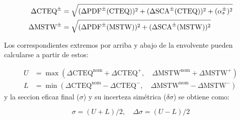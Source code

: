 \begin{align}
  \Delta\mathrm{CTEQ}^{\pm} &= \sqrt{(\Delta\mathrm{PDF}^{\pm}(\mathrm{CTEQ}))^2 + (\Delta\mathrm{SCA}^{\pm}(\mathrm{CTEQ}))^2 + (\alpha_s^{\pm})^2} \\
  \Delta\mathrm{MSTW}^{\pm} &= \sqrt{(\Delta\mathrm{PDF}^{\pm}(\mathrm{MSTW}))^2 + (\Delta\mathrm{SCA}^{\pm}(\mathrm{MSTW}))^2}
\end{align}

Los correspondientes extremos por arriba y abajo de la envolvente pueden calcularse a partir de estos:

\begin{align}
  U &= \max(\Delta\mathrm{CTEQ}^\mathrm{nom} + \Delta\mathrm{CTEQ}^{+},\quad \Delta\mathrm{MSTW}^\mathrm{nom} + \Delta\mathrm{MSTW}^{+}) \\
  L &= \min(\Delta\mathrm{CTEQ}^\mathrm{nom} - \Delta\mathrm{CTEQ}^{-},\quad \Delta\mathrm{MSTW}^\mathrm{nom} - \Delta\mathrm{MSTW}^{-})
\end{align}
%
y la seccion eficaz final ($\sigma$) y su incerteza simétrica ($\delta\sigma$) se obtiene como:

\begin{equation}
  \sigma = (U+L)/2,\quad \Delta\sigma = (U-L)/2
\end{equation}


